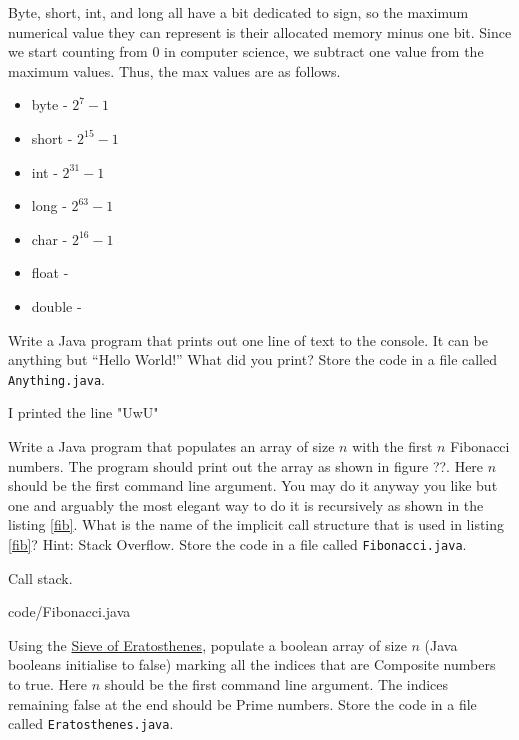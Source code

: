 \documentclass{homework}
\newcommand\callit[1]{Store the code in a file called \texttt{#1}.}
\begin{document}
\begin{sol}
  Byte, short, int, and long all have a bit dedicated to sign, so the maximum numerical value 
  they can represent is their allocated memory minus one bit. Since we start counting from 0 in computer science,
  we subtract one value from the maximum values. Thus, the max values are as follows.

  \begin{itemize}
    \item byte - $2^7-1$
    \item short - $2^{15}-1$
    \item int - $2^{31}-1$
    \item long - $2^{63}-1$
    \item char - $2^{16}-1$
    \item float - 
    \item double - 
  \end{itemize}
  
\end{sol}

\question Write a Java program that prints out one line of text to the
console. It can be anything but ``Hello World!'' What did you
print? \callit{Anything.java}

\begin{sol}
  I printed the line "UwU"
\end{sol}

\question Write a Java program that populates an array of size $n$ with the
first $n$ Fibonacci numbers. The program should print out the
array as shown in figure ??. Here $n$ should be the first
command line argument. You may do it anyway you like but one and
arguably the most elegant way to do it is recursively as shown in
the listing \ref{fib}. What is the name of the implicit call
structure that is used in listing \ref{fib}? Hint: Stack Overflow.
\callit{Fibonacci.java}


\begin{sol}
  Call stack.
\end{sol}


{code/Fibonacci.java}

\question Using the
\href{https://en.wikipedia.org/wiki/Sieve_of_Eratosthenes}{Sieve
  of Eratosthenes}, populate a boolean array of size $n$ (Java
booleans initialise to false) marking all the indices that are
Composite numbers to true. Here $n$ should be the first command
line argument. The indices remaining false at the end should be
Prime numbers.
  \callit{Eratosthenes.java}
\end{document}
